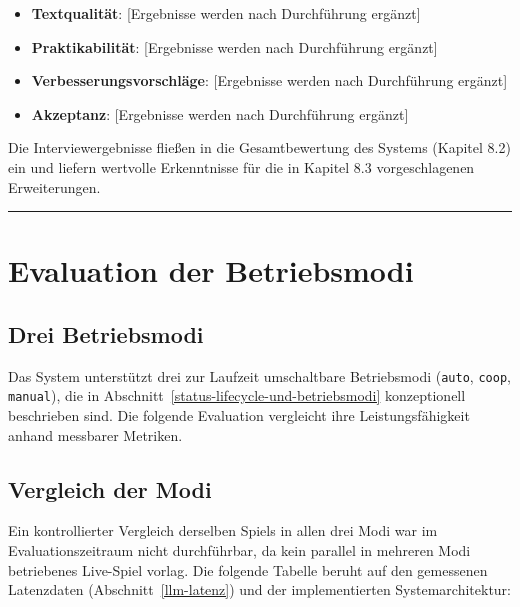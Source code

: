 \begin{itemize}
\tightlist
\item
  \textbf{Textqualität}: {[}Ergebnisse werden nach Durchführung
  ergänzt{]}
\item
  \textbf{Praktikabilität}: {[}Ergebnisse werden nach Durchführung
  ergänzt{]}
\item
  \textbf{Verbesserungsvorschläge}: {[}Ergebnisse werden nach
  Durchführung ergänzt{]}
\item
  \textbf{Akzeptanz}: {[}Ergebnisse werden nach Durchführung ergänzt{]}
\end{itemize}

Die Interviewergebnisse fließen in die Gesamtbewertung des Systems
(Kapitel 8.2) ein und liefern wertvolle Erkenntnisse für die in Kapitel
8.3 vorgeschlagenen Erweiterungen.

\begin{center}\rule{0.5\linewidth}{0.5pt}\end{center}

\section{Evaluation der Betriebsmodi}\label{evaluation-der-betriebsmodi}

\subsection{Drei Betriebsmodi}\label{drei-betriebsmodi}

Das System unterstützt drei zur Laufzeit umschaltbare Betriebsmodi
(\texttt{auto}, \texttt{coop}, \texttt{manual}), die in Abschnitt~\ref{status-lifecycle-und-betriebsmodi}
konzeptionell beschrieben sind. Die folgende Evaluation vergleicht ihre
Leistungsfähigkeit anhand messbarer Metriken.

\subsection{Vergleich der Modi}\label{vergleich-der-modi}

Ein kontrollierter Vergleich derselben Spiels in allen drei Modi war im
Evaluationszeitraum nicht durchführbar, da kein parallel in mehreren
Modi betriebenes Live-Spiel vorlag. Die folgende Tabelle beruht auf den
gemessenen Latenzdaten (Abschnitt~\ref{llm-latenz}) und der implementierten
Systemarchitektur:

